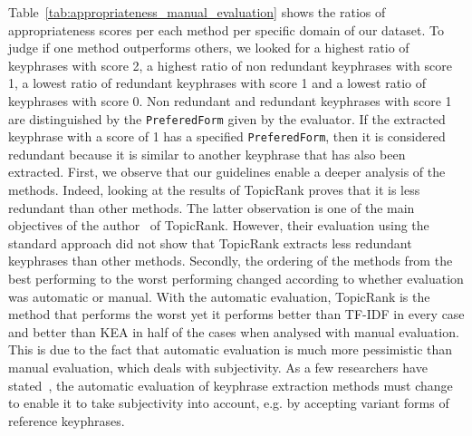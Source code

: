        Table~\ref{tab:appropriateness_manual_evaluation} shows the ratios of appropriateness scores per each method per specific domain of our dataset.
        To judge if one method outperforms others, we looked for a highest ratio of keyphrases with score 2, a highest ratio of non redundant keyphrases with score 1, a lowest ratio of redundant keyphrases with score 1 and a lowest ratio of keyphrases with score 0.
        Non redundant and redundant keyphrases with score 1 are distinguished by the \texttt{PreferedForm} given by the evaluator.
        If the extracted keyphrase with a score of 1 has a specified \texttt{PreferedForm}, then it is considered redundant because it is similar to another keyphrase that has also been extracted.
        First, we observe that our guidelines enable a deeper analysis of the methods.
        Indeed, looking at the results of TopicRank proves that it is less redundant than other methods.
        The latter observation is one of the main objectives of the author~\cite{bougouin2013topicrank} of TopicRank.
        However, their evaluation using the standard approach did not show that TopicRank extracts less redundant keyphrases than other methods.
        Secondly, the ordering of the methods from the best performing to the worst performing changed according to whether evaluation was automatic or manual.
        With the automatic evaluation, TopicRank is the method that performs the worst yet it performs better than TF-IDF in every case and better than KEA in half of the cases when analysed with manual evaluation.
        This is due to the fact that automatic evaluation is much more pessimistic than manual evaluation, which deals with subjectivity.
        As a few researchers have stated~\cite{zesch2009rprecision,kim2010rprecision}, the automatic evaluation of keyphrase extraction methods must change to enable it to take subjectivity into account, e.g. by accepting variant forms of reference keyphrases.
